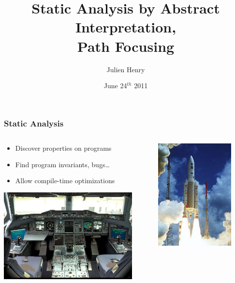 \documentclass{beamer}
\title[Path-focusing]{Static Analysis by Abstract Interpretation, \\ Path Focusing}
\author[Julien Henry]{Julien Henry}
\institute[Verimag]{Grenoble INP Ensimag \\~\\ Tutors: \\ David Monniaux, Matthieu
Moy}
\date{June 24$^{th}$ 2011}
\begin{document}
\begin{frame}
  \titlepage
\end{frame}

\begin{frame}
\frametitle{Static Analysis}
\begin{columns}
\begin{column}{7cm}
\begin{itemize}
\item Discover properties on programs
\item Find program invariants, bugs\ldots
\item Allow compile-time optimizations
\end{itemize}
\includegraphics[width=7cm]{a380cockpit}
\end{column}

\begin{column}{4cm}
\includegraphics[width=4cm]{ariane}
\end{column}
\end{columns}
\end{frame}
\end{document}
